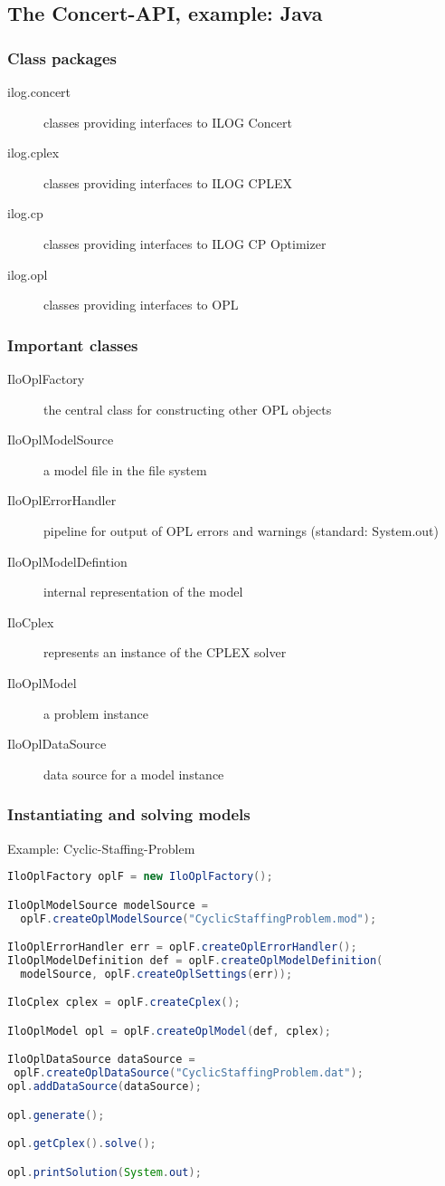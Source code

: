 \subsection{The Concert-API, example: Java}
\begin{frame}
 \frametitle{Class packages}
 \begin{description}
  \item[ilog.concert] classes providing interfaces to ILOG Concert
  \item[ilog.cplex] classes providing interfaces to ILOG CPLEX
  \item[ilog.cp] classes providing interfaces to ILOG CP Optimizer
  \item[ilog.opl] classes providing interfaces to OPL
 \end{description}
\end{frame}

\begin{frame}
 \frametitle{Important classes}
 \begin{description}
  \item[IloOplFactory] the central class for constructing other OPL objects
  \item[IloOplModelSource] a model file in the file system
  \item[IloOplErrorHandler] pipeline for output of OPL errors and warnings (standard: System.out)
  \item[IloOplModelDefintion] internal representation of the model 
  \item[IloCplex] represents an instance of the CPLEX solver
  \item[IloOplModel] a problem instance
  \item[IloOplDataSource] data source for a model instance
 \end{description}
\end{frame}

\begin{frame}[fragile]
 \frametitle{Instantiating and solving models}
 \begin{block}{Example: Cyclic-Staffing-Problem}
\begin{lstlisting}[language=java,numbers=none,basicstyle=\tiny\ttfamily]
IloOplFactory oplF = new IloOplFactory();

IloOplModelSource modelSource =
  oplF.createOplModelSource("CyclicStaffingProblem.mod");

IloOplErrorHandler err = oplF.createOplErrorHandler();
IloOplModelDefinition def = oplF.createOplModelDefinition(
  modelSource, oplF.createOplSettings(err));

IloCplex cplex = oplF.createCplex();

IloOplModel opl = oplF.createOplModel(def, cplex);

IloOplDataSource dataSource =
 oplF.createOplDataSource("CyclicStaffingProblem.dat");
opl.addDataSource(dataSource);

opl.generate();

opl.getCplex().solve();

opl.printSolution(System.out);
\end{lstlisting}
 \end{block}
\end{frame}


